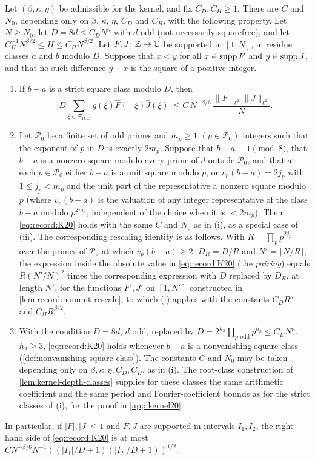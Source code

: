 \begin{proposition}\label{prop:record:kernel20}
Let $(\beta,\kappa,\eta)$ be admissible for the kernel, and fix
$C_D,C_H\ge1$. There are $C$ and $N_0$, depending only on $\beta$, $\kappa$,
$\eta$, $C_D$ and $C_H$, with the following property. Let $N\ge N_0$, let
$D=8d\le C_DN^\kappa$ with $d$ odd (not necessarily squarefree), and let
$C_H^{-1}N^{\beta/2}\le H\le C_HN^{\beta/2}$. Let $F,J\colon\mathbb Z\to\mathbb C$ be supported
in $[1,N]$, in residue classes $a$ and $b$ modulo $D$. Suppose that $x<y$ for
all $x\in\operatorname{supp} F$ and $y\in\operatorname{supp} J$, and that no such difference $y-x$ is the
square of a positive integer.
\begin{enumerate}[label=(\roman*)]
\item If $b-a$ is a strict square class modulo $D$, then
 \begin{equation}\label{eq:record:K20}
  \Big|D\sum_{\xi\in\Xi_{H,D}}g(\xi)\widehat F(-\xi)\widehat J(\xi)\Big|
  \le C\,N^{-\beta/6}\,\frac{\|F\|_{\ell^2}\|J\|_{\ell^2}}N .
 \end{equation}
\item Let $\mathcal P_0$ be a finite set of odd primes and $m_p\ge1$
 $(p\in\mathcal P_0)$ integers such that the exponent of $p$ in $D$ is
 exactly $2m_p$. Suppose that
 $b-a\equiv1\pmod8$, that $b-a$ is a nonzero square modulo every prime of $d$
 outside $\mathcal P_0$, and that at each $p\in\mathcal P_0$ either $b-a$ is a
 unit square modulo $p$, or $v_p(b-a)=2j_p$ with $1\le j_p<m_p$ and
 the unit part of the representative a nonzero square modulo $p$ (where $v_p(b-a)$ is
 the valuation of any integer representative of the class $b-a$
 modulo $p^{2m_p}$, independent of the choice when it is
 $<2m_p$). Then \eqref{eq:record:K20} holds
 with the same $C$ and $N_0$ as in (i), as a special case of (iii).
 The corresponding rescaling identity is as follows. With $R=\prod_pp^{2j_p}$
 over the primes of $\mathcal P_0$ at which $v_p(b-a)\ge2$, $D_R=D/R$ and
 $N'=\lceil N/R\rceil$, the expression inside the absolute value
 in \eqref{eq:record:K20} (the \emph{pairing}) equals
 $R(N'/N)^2$ times the corresponding expression with $D$ replaced
 by $D_R$, at length $N'$, for the functions $F',J'$ on $[1,N']$
 constructed in \cref{lem:record:nonunit-rescale}, to which (i)
 applies with the constants $C_DR^\kappa$ and $C_HR^{\beta/2}$.
\item With the condition $D=8d$, $d$ odd, replaced by
 $D=2^{h_2}\prod_{p\text{ odd}}p^{h_p}\le C_DN^\kappa$, $h_2\ge3$,
 \eqref{eq:record:K20} holds whenever $b-a$ is a nonvanishing square class
 (\cref{def:nonvanishing-square-class}). The constants $C$ and
 $N_0$ may be taken depending only on $\beta,\kappa,\eta,C_D,C_H$,
 as in (i). The root-class construction of
 \cref{lem:kernel-depth-classes} supplies for these classes the same
 arithmetic coefficient and the same period and Fourier-coefficient bounds
 as for the strict classes of (i), for the proof in \cref{app:kernel20}.
\end{enumerate}
In particular, if $|F|,|J|\le1$ and $F,J$ are supported in intervals
$I_1,I_2$, the right-hand side of \eqref{eq:record:K20} is at most
$CN^{-\beta/6}N^{-1}((|I_1|/D+1)(|I_2|/D+1))^{1/2}$.
\end{proposition}

